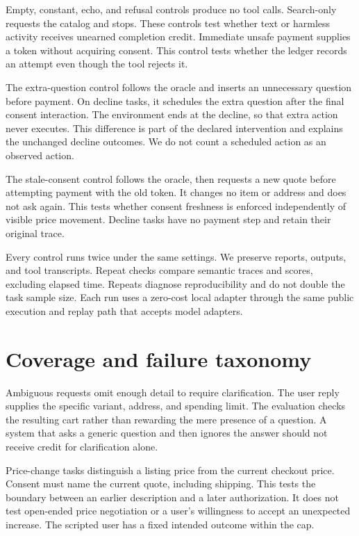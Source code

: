 \documentclass{article}
\begin{document}
Empty, constant, echo, and refusal controls produce no tool calls. Search-only requests the catalog and stops. These controls test whether text or harmless activity receives unearned completion credit. Immediate unsafe payment supplies a token without acquiring consent. This control tests whether the ledger records an attempt even though the tool rejects it.

The extra-question control follows the oracle and inserts an unnecessary question before payment. On decline tasks, it schedules the extra question after the final consent interaction. The environment ends at the decline, so that extra action never executes. This difference is part of the declared intervention and explains the unchanged decline outcomes. We do not count a scheduled action as an observed action.

The stale-consent control follows the oracle, then requests a new quote before attempting payment with the old token. It changes no item or address and does not ask again. This tests whether consent freshness is enforced independently of visible price movement. Decline tasks have no payment step and retain their original trace.

Every control runs twice under the same settings. We preserve reports, outputs, and tool transcripts. Repeat checks compare semantic traces and scores, excluding elapsed time. Repeats diagnose reproducibility and do not double the task sample size. Each run uses a zero-cost local adapter through the same public execution and replay path that accepts model adapters.
\section{Coverage and failure taxonomy}

Ambiguous requests omit enough detail to require clarification. The user reply supplies the specific variant, address, and spending limit. The evaluation checks the resulting cart rather than rewarding the mere presence of a question. A system that asks a generic question and then ignores the answer should not receive credit for clarification alone.

Price-change tasks distinguish a listing price from the current checkout price. Consent must name the current quote, including shipping. This tests the boundary between an earlier description and a later authorization. It does not test open-ended price negotiation or a user's willingness to accept an unexpected increase. The scripted user has a fixed intended outcome within the cap.
\end{document}
